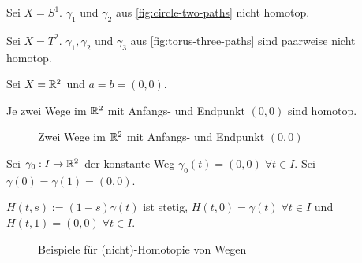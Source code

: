 \begin{beispiel}
    \begin{bspenum}
        \item Sei $X = S^1$. $\gamma_1$ und $\gamma_2$ aus 
              \cref{fig:circle-two-paths} nicht homotop.
        \item Sei $X = T^2$. $\gamma_1, \gamma_2$ und $\gamma_3$
              aus \cref{fig:torus-three-paths} sind paarweise
              nicht homotop.
        \item Sei $X = \mathbb{R}^2$ und $a=b=(0,0)$. 

              Je zwei Wege im $\mathbb{R}^2$ mit Anfangs- und Endpunkt $(0,0)$
              sind homotop.

              \begin{figure}[htp]
                \centering
                
                \caption{Zwei Wege im $\mathbb{R}^2$ mit Anfangs- und Endpunkt $(0,0)$}
                \label{fig:paths-from-origin}
              \end{figure}

              Sei $\gamma_0: I \rightarrow \mathbb{R}^2$ der konstante Weg
              $\gamma_0(t) = (0,0) \; \forall t \in I$. Sei
              $\gamma(0) = \gamma(1) = (0,0)$.

              $H(t,s) := (1-s) \gamma(t)$ ist stetig, 
              $H(t,0) = \gamma(t)\; \forall t \in I$ und
              $H(t,1) = (0,0) \; \forall t \in I$.
    \end{bspenum}

    \begin{figure}[ht]
        \centering
        \label{fig:homotop-paths}
        \caption{Beispiele für (nicht)-Homotopie von Wegen}
    \end{figure}
\end{beispiel}


